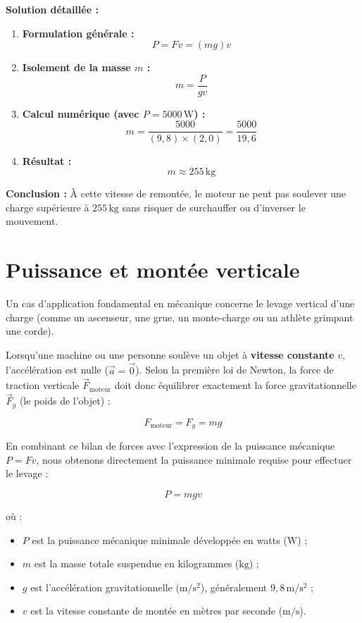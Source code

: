 \documentclass[11pt,openany]{book}
\begin{document}
\noindent\textbf{Solution détaillée :}

\begin{enumerate}
    \item \textbf{Formulation générale :}
    \[
    P = F v = (m g) v
    \]

    \item \textbf{Isolement de la masse $m$ :}
    \[
    m = \frac{P}{g v}
    \]

    \item \textbf{Calcul numérique (avec $P = \mathrm{5000\,W}$) :}
    \[
    m = \frac{5000}{(9{,}8) \times (2{,}0)} = \frac{5000}{19{,}6}
    \]

    \item \textbf{Résultat :}
    \[
    \boxed{m \approx \mathrm{255\,kg}}
    \]
\end{enumerate}

\noindent\textbf{Conclusion :} À cette vitesse de remontée, le moteur ne peut pas soulever une charge supérieure à $255\,\mathrm{kg}$ sans risquer de surchauffer ou d'inverser le mouvement.
\section{Puissance et montée verticale}

Un cas d'application fondamental en mécanique concerne le levage vertical d'une charge (comme un ascenseur, une grue, un monte-charge ou un athlète grimpant une corde).

Lorsqu'une machine ou une personne soulève un objet à \textbf{vitesse constante} $v$, l'accélération est nulle ($\vec{a} = \vec{0}$). Selon la première loi de Newton, la force de traction verticale $\vec{F}_{\text{moteur}}$ doit donc équilibrer exactement la force gravitationnelle $\vec{F}_g$ (le poids de l'objet) :

\[
F_{\text{moteur}} = F_g = mg
\]

En combinant ce bilan de forces avec l'expression de la puissance mécanique $P = F v$, nous obtenons directement la puissance minimale requise pour effectuer le levage :

\[
\boxed{P = mgv}
\]

où :
\begin{itemize}
    \item $P$ est la puissance mécanique minimale développée en watts ($\mathrm{W}$) ;
    \item $m$ est la masse totale suspendue en kilogrammes ($\mathrm{kg}$) ;
    \item $g$ est l'accélération gravitationnelle ($\mathrm{m/s^2}$), généralement $9{,}8\,\mathrm{m/s^2}$ ;
    \item $v$ est la vitesse constante de montée en mètres par seconde ($\mathrm{m/s}$).
\end{itemize}
\end{document}
